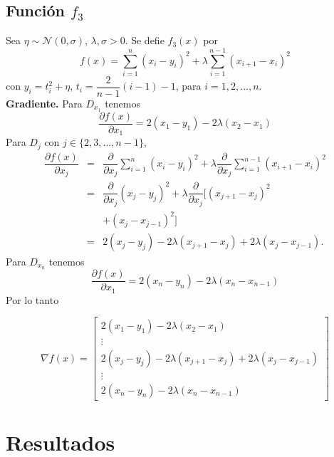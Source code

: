 \documentclass[11pt,letterpaper]{article}
\theoremstyle{definition}
\theoremstyle{definition}
\theoremstyle{definition}
\begin{document}
\subsection{Función $ f_3 $}
Sea $ \eta \sim \mathcal{N} (0, \sigma) $, $\lambda, \sigma > 0 $. Se defie $ f_3(x) $ por
\[ f(x) = \sum_{i = 1}^n (x_i - y_i)^2 + \lambda \sum_{i = 1}^{n-1} (x_{i+1} - x_i)^2 \]
con $ y_i = t_i^2 + \eta $, $ t_i = \dfrac{2}{n-1} (i-1) - 1 $, para $ i = 1, 2, \dots, n $.
\\
\textbf{Gradiente.} Para $ D_{x_1} $ tenemos
\[ 	\dfrac{\partial f(x)}{\partial x_1} = 2 (x_1 - y_1) - 2\lambda (x_2 - x_1) \]
Para $ D_j  $ con $ j \in \{ 2, 3, \dots, n-1 \} $,
\begin{eqnarray*}
	\dfrac{\partial f(x)}{\partial x_j} & = & \dfrac{\partial}{\partial x_j} \sum_{i = 1}^n (x_i - y_i)^2 + \lambda \dfrac{\partial}{\partial x_j} \sum_{i = 1}^{n-1} (x_{i+1} - x_i)^2 \\
										& = & \dfrac{\partial}{\partial x_j} (x_j - y_j)^2 + \lambda \dfrac{\partial}{\partial x_j} [(x_{j+1} - x_j)^2 \\
										&   & + (x_j - x_{j-1})^2] \\
										& = & 2(x_j - y_j) - 2 \lambda (x_{j+1} - x_j) + 2 \lambda (x_j - x_{j-1}).
\end{eqnarray*}
Para $ D_{x_n} $ tenemos
\[ 	\dfrac{\partial f(x)}{\partial x_1} = 2 (x_n - y_n) - 2\lambda (x_n - x_{n-1}) \]
Por lo tanto
\begin{shaded*}
	\footnotesize{\begin{equation*}
		\nabla f(x) = \left[\begin{matrix}
							2(x_1 - y_1) - 2 \lambda (x_2 - x_1) \\
							\vdots \\
							2(x_j - y_j) - 2 \lambda (x_{j+1} - x_j) + 2 \lambda (x_j - x_{j-1}) \\
							\vdots \\
							2 (x_n - y_n) - 2\lambda (x_n - x_{n-1})							
		\end{matrix}\right]
	\end{equation*}}
\end{shaded*}






\section{Resultados}
\end{document}
